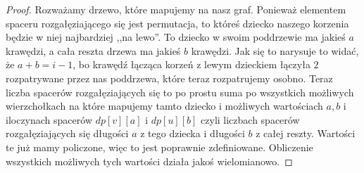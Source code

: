     \begin{proof}
        Rozważamy drzewo, które mapujemy na nasz graf. Ponieważ elementem spaceru rozgałęziającego się jest permutacja, to któreś dziecko naszego korzenia będzie w niej najbardziej ,,na lewo''. To dziecko w swoim poddrzewie ma jakieś $a$ krawędzi, a cała reszta drzewa ma jakieś $b$ krawędzi. Jak się to narysuje to widać, że $a + b = i-1$, bo krawędź łącząca korzeń z lewym dzieckiem łączyła $2$ rozpatrywane przez nas poddrzewa, które teraz rozpatrujemy osobno. Teraz liczba spacerów rozgałęziających się to po prostu suma po wszystkich możliwych wierzchołkach na które mapujemy tamto dziecko i możliwych wartościach $a, b$ i iloczynach spacerów $dp[v][a]$ i $dp[u][b]$ czyli liczbach spacerów rozgałęziających się długości $a$ z tego dziecka i długości $b$ z całej reszty. Wartości te już mamy policzone, więc to jest poprawnie zdefiniowane. Obliczenie wszystkich możliwych tych wartości działa jakoś wielomianowo.
        

\end{proof}
